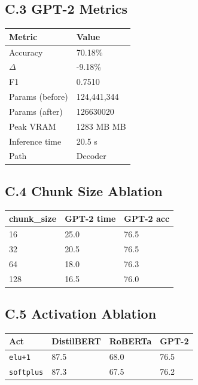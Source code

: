 \subsection{C.3 GPT-2 Metrics}

\begin{table}[H]
\centering
\small
\begin{tabular}{ll}
\toprule
\textbf{Metric} & \textbf{Value} \\
\midrule
Accuracy & 70.18\% \\
$\Delta$ & -9.18\% \\
F1 & 0.7510 \\
Params (before) & 124,441,344 \\
Params (after) & 126630020 \\
Peak VRAM & 1283 MB MB \\
Inference time & 20.5 s \\
Path & Decoder \\
\bottomrule
\end{tabular}
\end{table}

\subsection{C.4 Chunk Size Ablation}

\begin{table}[H]
\centering
\small
\begin{tabular}{lll}
\toprule
\textbf{chunk\_size} & \textbf{GPT-2 time} & \textbf{GPT-2 acc} \\
\midrule
16 & 25.0 & 76.5 \\
32 & 20.5 & 76.5 \\
64 & 18.0 & 76.3 \\
128 & 16.5 & 76.0 \\
\bottomrule
\end{tabular}
\end{table}

\subsection{C.5 Activation Ablation}

\begin{table}[H]
\centering
\small
\begin{tabular}{llll}
\toprule
\textbf{Act} & \textbf{DistilBERT} & \textbf{RoBERTa} & \textbf{GPT-2} \\
\midrule
\texttt{elu+1} & 87.5 & 68.0 & 76.5 \\
\texttt{softplus} & 87.3 & 67.5 & 76.2 \\
\bottomrule
\end{tabular}
\end{table}

